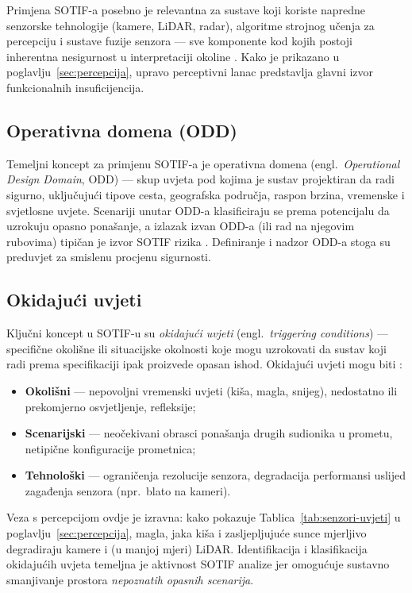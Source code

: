 Primjena SOTIF-a posebno je relevantna za sustave koji koriste napredne senzorske tehnologije (kamere, LiDAR, radar), algoritme strojnog učenja za percepciju i sustave fuzije senzora — sve komponente kod kojih postoji inherentna nesigurnost u interpretaciji okoline \cite{patel2025sotifslr}. Kako je prikazano u poglavlju~\ref{sec:percepcija}, upravo perceptivni lanac predstavlja glavni izvor funkcionalnih insuficijencija.

\subsection{Operativna domena (ODD)}

Temeljni koncept za primjenu SOTIF-a je operativna domena (engl.\ \textit{Operational Design Domain}, ODD) — skup uvjeta pod kojima je sustav projektiran da radi sigurno, uključujući tipove cesta, geografska područja, raspon brzina, vremenske i svjetlosne uvjete. Scenariji unutar ODD-a klasificiraju se prema potencijalu da uzrokuju opasno ponašanje, a izlazak izvan ODD-a (ili rad na njegovim rubovima) tipičan je izvor SOTIF rizika \cite{patel2025sotifslr}. Definiranje i nadzor ODD-a stoga su preduvjet za smislenu procjenu sigurnosti.

\subsection{Okidajući uvjeti}

Ključni koncept u SOTIF-u su \textit{okidajući uvjeti} (engl.\ \textit{triggering conditions}) — specifične okolišne ili situacijske okolnosti koje mogu uzrokovati da sustav koji radi prema specifikaciji ipak proizvede opasan ishod. Okidajući uvjeti mogu biti \cite{iso21448, patel2025sotifslr}:

\begin{itemize}
  \item \textbf{Okolišni} — nepovoljni vremenski uvjeti (kiša, magla, snijeg), nedostatno ili prekomjerno osvjetljenje, refleksije;
  \item \textbf{Scenarijski} — neočekivani obrasci ponašanja drugih sudionika u prometu, netipične konfiguracije prometnica;
  \item \textbf{Tehnološki} — ograničenja rezolucije senzora, degradacija performansi uslijed zagađenja senzora (npr.\ blato na kameri).
\end{itemize}

Veza s percepcijom ovdje je izravna: kako pokazuje Tablica~\ref{tab:senzori-uvjeti} u poglavlju~\ref{sec:percepcija}, magla, jaka kiša i zasljepljujuće sunce mjerljivo degradiraju kamere i (u manjoj mjeri) LiDAR. Identifikacija i klasifikacija okidajućih uvjeta temeljna je aktivnost SOTIF analize jer omogućuje sustavno smanjivanje prostora \textit{nepoznatih opasnih scenarija}.

